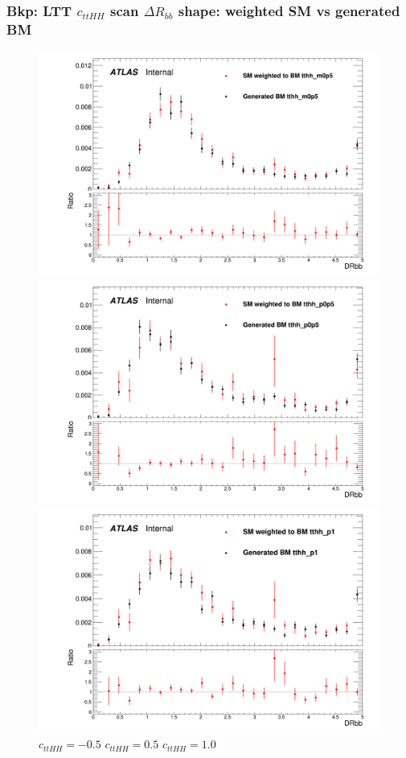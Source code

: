 \documentclass[twoside,11pt]{beamer}
\begin{document}
\begin{frame}
\frametitle{Bkp: LTT $c_{ttHH}$ scan $\Delta R_{bb}$ shape: weighted SM vs generated BM}
\begin{figure}
\includegraphics[width=.32\textwidth]{figures/Method_B_all_latest_LTT/BMtthh_m0p5h_DRbb.png}
\includegraphics[width=.32\textwidth]{figures/Method_B_all_latest_LTT/BMtthh_p0p5h_DRbb.png}
\includegraphics[width=.32\textwidth]{figures/Method_B_all_latest_LTT/BMtthh_p1h_DRbb.png}
$c_{ttHH} = -0.5$ \hspace{5em} $c_{ttHH} = 0.5$\hspace{5em} $c_{ttHH} = 1.0$    
\end{figure}

\end{frame}   
\end{document}
